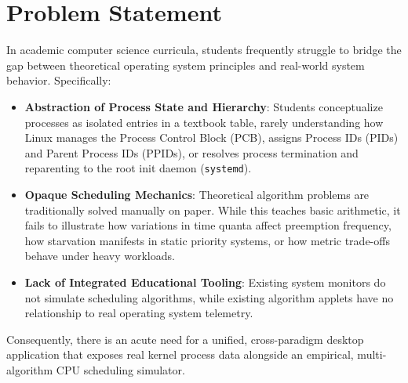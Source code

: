 \documentclass[12pt,a4paper]{article}
\begin{document}
\section{Problem Statement}
In academic computer science curricula, students frequently struggle to bridge the gap between theoretical operating system principles and real-world system behavior. Specifically:
\begin{itemize}
    \item \textbf{Abstraction of Process State and Hierarchy}: Students conceptualize processes as isolated entries in a textbook table, rarely understanding how Linux manages the Process Control Block (PCB), assigns Process IDs (PIDs) and Parent Process IDs (PPIDs), or resolves process termination and reparenting to the root init daemon (\texttt{systemd}).
    \item \textbf{Opaque Scheduling Mechanics}: Theoretical algorithm problems are traditionally solved manually on paper. While this teaches basic arithmetic, it fails to illustrate how variations in time quanta affect preemption frequency, how starvation manifests in static priority systems, or how metric trade-offs behave under heavy workloads.
    \item \textbf{Lack of Integrated Educational Tooling}: Existing system monitors do not simulate scheduling algorithms, while existing algorithm applets have no relationship to real operating system telemetry.
\end{itemize}
Consequently, there is an acute need for a unified, cross-paradigm desktop application that exposes real kernel process data alongside an empirical, multi-algorithm CPU scheduling simulator.
\end{document}
